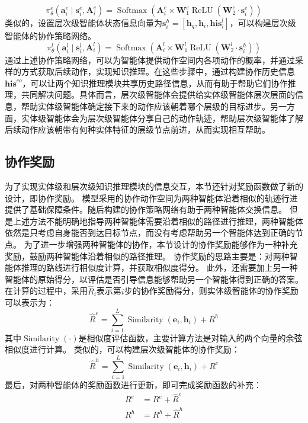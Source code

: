 \documentclass[algorithmlist, AutoFakeBold, AutoFakeSlant, figurelist, tablelist, nomlist, engineering]{seuthesix}
\begin{document}
\begin{equation}
  \pi_\theta^e\left(\bm{a}_i^e \mid \bm{s}_i^e, \bm{A}_i^e\right) =\operatorname{Softmax}\left(\bm{A}_i^e \times \mathbf{W}_1^e \operatorname{ReLU}\left(\mathbf{W}_2^e \cdot \bm{s}_i^{e}\right)\right)
  \label{pi_1}
\end{equation}
类似的，设置层次级智能体状态信息向量为$\bm{s}_i^{h} = \left[\bm{h}_q, \bm{h}_i, \bm{his}_i^l\right]$，可以构建层次级智能体的协作策略网络。
\begin{equation}
  \pi_\theta^l\left(\bm{a}_i^l \mid \bm{s}_i^l, \bm{A}_i^l\right) =\operatorname{Softmax}\left(\bm{A}_i^l \times \mathbf{W}_1^l \operatorname{ReLU}\left(\mathbf{W}_2^l \cdot \bm{s}_i^{h}\right)\right)
  \label{pi_2}
\end{equation}
通过上述协作策略网络，可以为智能体提供动作空间内各项动作的概率，并通过采样的方式获取后续动作，实现知识推理。在这些步骤中，通过构建协作历史信息$\bm{his}^{co}$，可以让两个知识推理模块共享历史路径信息，从而有助于帮助它们协作推理，共同解决问题。具体而言，层次级智能体会提供给实体级智能体层次层面的信息，帮助实体级智能体确定接下来的动作应该朝着哪个层级的目标进步。另一方面，实体级智能体会为层次级智能体分享自己的动作轨迹，帮助层次级智能体了解后续动作应该朝带有何种实体特征的层级节点前进，从而实现相互帮助。

\subsection{协作奖励}
为了实现实体级和层次级知识推理模块的信息交互，本节还针对奖励函数做了新的设计，即协作奖励。
模型采用的协作动作空间为两种智能体沿着相似的轨迹行进提供了基础保障条件。随后构建的协作策略网络有助于两种智能体交换信息。
但是上述方法不能明确地指导两种智能体需要沿着相似的路径进行推理，两种智能体依然是只考虑自身能否到达目标节点，而没有考虑帮助另一个智能体达到正确的节点。
为了进一步增强两种智能体的协作，本节设计的协作奖励能够作为一种补充奖励，鼓励两种智能体沿着相似的路径推理。
协作奖励的思路主要是：对两种智能体推理的路线进行相似度计算，并获取相似度得分。
此外，还需要加上另一种智能体的原始得分，以评估是否引导信息能够帮助另一个智能体得到正确的答案。
在计算的过程中，采用$\hat{R}_i$表示第$i$步的协作奖励得分，则实体级智能体的协作奖励可以表示为：
\begin{equation}
  \hat{R}^e = \sum_{i=1}^{L} \operatorname{Similarity}(\bm{e}_i, \bm{h}_i) + R^h
  \label{similar_1}
\end{equation}
其中$\operatorname{Similarity}(\cdot)$是相似度评估函数，主要计算方法是对输入的两个向量的余弦相似度进行计算。
类似的，可以构建层次级智能体的协作奖励：
\begin{equation}
  \hat{R}^h = \sum_{i=1}^{L} \operatorname{Similarity}(\bm{e}_i, \bm{h}_i) + R^e
  \label{similar_2}
\end{equation}
最后，对两种智能体的奖励函数进行更新，即可完成奖励函数的补充：
\begin{equation}
  \begin{aligned}
    R^e &= R^e + \hat{R}^e \\
    R^h &= R^h + \hat{R}^h
  \end{aligned}
  \label{similar_reward}
\end{equation}
\end{document}
